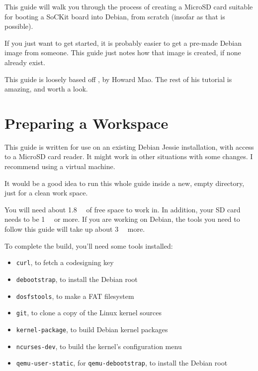 \documentclass{sockitguide}
\begin{document}

This guide will walk you through the process of creating a MicroSD card
suitable for booting a SoCKit board into Debian, from scratch (insofar
as that is possible).

If you just want to get started, it is probably easier to get a pre-made
Debian image from someone. This guide just notes how that image is
created, if none already exist.

This guide is loosely based off , by
Howard Mao. The rest of his tutorial is amazing, and worth a look.

\section{Preparing a Workspace}

This guide is written for use on an existing Debian Jessie installation,
with access to a MicroSD card reader. It might work in other situations
with some changes. I recommend using a virtual machine.

It would be a good idea to run this whole guide inside a new, empty
directory, just for a clean work space.

You will need about \SI{1.8}{\gibi\byte} of free space to work in. In
addition, your SD card needs to be \SI{1}{\gibi\byte} or more. If you
are working on Debian, the tools you need to follow this guide will
take up about \SI{3}{\gibi\byte} more.

To complete the build, you'll need some tools installed:
\begin{itemize}
\item \texttt{curl}, to fetch a codesigning key
\item \texttt{debootstrap}, to install the Debian root
\item \texttt{dosfstools}, to make a FAT filesystem
\item \texttt{git}, to clone a copy of the Linux kernel sources
\item \texttt{kernel-package}, to build Debian kernel packages
\item \texttt{ncurses-dev}, to build the kernel's configuration menu
\item \texttt{qemu-user-static}, for \texttt{qemu-debootstrap}, to install the Debian root
\end{itemize}
\end{document}
